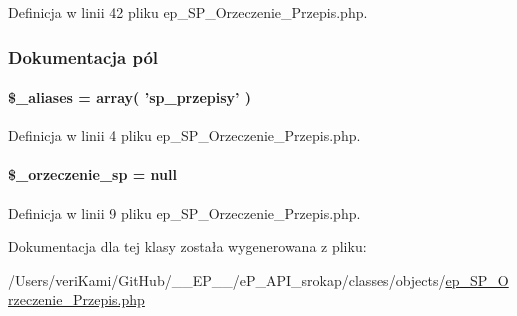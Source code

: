 Definicja w linii 42 pliku ep\-\_\-\-S\-P\-\_\-\-Orzeczenie\-\_\-\-Przepis.\-php.



\subsubsection{Dokumentacja pól}
\hypertarget{classep___s_p___orzeczenie___przepis_ab4e31d75f0bc5d512456911e5d01366b}{
\paragraph[{\$\-\_\-aliases}]{\setlength{\rightskip}{0pt plus 5cm}\$\-\_\-aliases = array( 'sp\-\_\-przepisy' )}}\label{classep___s_p___orzeczenie___przepis_ab4e31d75f0bc5d512456911e5d01366b}


Definicja w linii 4 pliku ep\-\_\-\-S\-P\-\_\-\-Orzeczenie\-\_\-\-Przepis.\-php.

\hypertarget{classep___s_p___orzeczenie___przepis_aa2e1ecb50e6fae26a854ac995f7226b8}{
\paragraph[{\$\-\_\-orzeczenie\-\_\-sp}]{\setlength{\rightskip}{0pt plus 5cm}\$\-\_\-orzeczenie\-\_\-sp = null\hspace{0.3cm}{\ttfamily [protected]}}}\label{classep___s_p___orzeczenie___przepis_aa2e1ecb50e6fae26a854ac995f7226b8}


Definicja w linii 9 pliku ep\-\_\-\-S\-P\-\_\-\-Orzeczenie\-\_\-\-Przepis.\-php.



Dokumentacja dla tej klasy została wygenerowana z pliku\-:\begin{DoxyCompactItemize}
\item 
/\-Users/veri\-Kami/\-Git\-Hub/\-\_\-\-\_\-\-E\-P\-\_\-\-\_\-/e\-P\-\_\-\-A\-P\-I\-\_\-srokap/classes/objects/\hyperlink{ep___s_p___orzeczenie___przepis_8php}{ep\-\_\-\-S\-P\-\_\-\-Orzeczenie\-\_\-\-Przepis.\-php}\end{DoxyCompactItemize}
